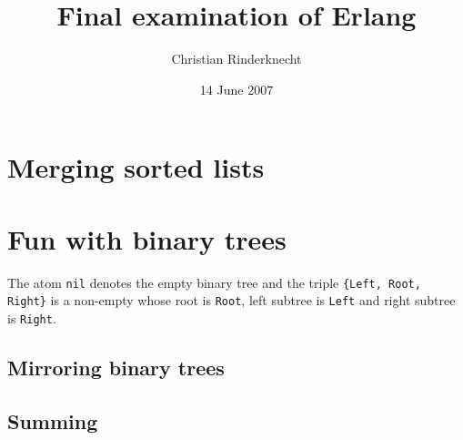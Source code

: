 \documentclass[11pt, a4paper]{article}
\title{Final examination of Erlang}
\author{Christian Rinderknecht}
\date{14 June 2007}
\begin{document}
\maketitle

\thispagestyle{empty}

\section{Merging sorted lists}



\section{Fun with binary trees}

The atom \texttt{nil} denotes the empty binary tree and the triple
\texttt{\{Left, Root, Right\}} is a non\hyp{}empty whose root is
\texttt{Root}, left subtree is \texttt{Left} and right subtree is
\texttt{Right}.

\subsection{Mirroring binary trees}



\subsection{Summing}


\end{document}
